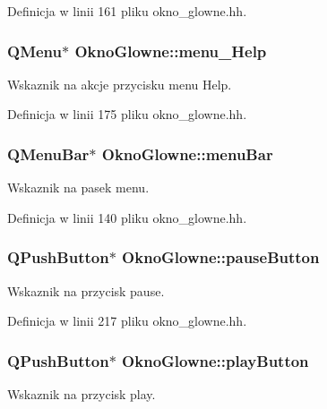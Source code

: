 Definicja w linii 161 pliku okno\-\_\-glowne.\-hh.

\hypertarget{class_okno_glowne_ab17be6714913af0cdf4e7de7cb6210d1}{
\subsubsection[{menu\-\_\-\-Help}]{\setlength{\rightskip}{0pt plus 5cm}Q\-Menu$\ast$ Okno\-Glowne\-::menu\-\_\-\-Help}}\label{class_okno_glowne_ab17be6714913af0cdf4e7de7cb6210d1}
Wskaznik na akcje przycisku menu Help. 

Definicja w linii 175 pliku okno\-\_\-glowne.\-hh.

\hypertarget{class_okno_glowne_a5a87098d9d4bd868670f5a5e72023a0a}{
\subsubsection[{menu\-Bar}]{\setlength{\rightskip}{0pt plus 5cm}Q\-Menu\-Bar$\ast$ Okno\-Glowne\-::menu\-Bar}}\label{class_okno_glowne_a5a87098d9d4bd868670f5a5e72023a0a}
Wskaznik na pasek menu. 

Definicja w linii 140 pliku okno\-\_\-glowne.\-hh.

\hypertarget{class_okno_glowne_a0dde8df8a49b8f47f17f8e748fd15967}{
\subsubsection[{pause\-Button}]{\setlength{\rightskip}{0pt plus 5cm}Q\-Push\-Button$\ast$ Okno\-Glowne\-::pause\-Button}}\label{class_okno_glowne_a0dde8df8a49b8f47f17f8e748fd15967}
Wskaznik na przycisk pause. 

Definicja w linii 217 pliku okno\-\_\-glowne.\-hh.

\hypertarget{class_okno_glowne_a50f936486c1bc3b3278823a8eb90841e}{
\subsubsection[{play\-Button}]{\setlength{\rightskip}{0pt plus 5cm}Q\-Push\-Button$\ast$ Okno\-Glowne\-::play\-Button}}\label{class_okno_glowne_a50f936486c1bc3b3278823a8eb90841e}
Wskaznik na przycisk play. 

